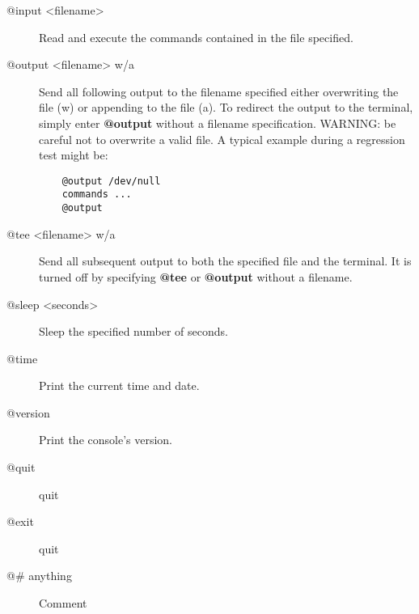 \begin{description}

\item [@input {\textless}filename{\textgreater}]
   Read and execute the commands  contained in the file specified.

\item [@output {\textless}filename{\textgreater} w/a]
   Send all following output to the  filename specified either overwriting the
file (w) or appending to  the file (a). To redirect the output to the
terminal, simply enter  {\bf @output} without a filename specification.
WARNING: be careful  not to overwrite a valid file. A typical example during a
regression  test might be:

\footnotesize
\begin{verbatim}
    @output /dev/null
    commands ...
    @output

\end{verbatim}
\normalsize

\item [@tee {\textless}filename{\textgreater} w/a]
   Send all subsequent output to  both the specified file and the terminal. It is
   turned off by  specifying {\bf @tee} or {\bf @output} without a filename.

\item [@sleep {\textless}seconds{\textgreater}]
   Sleep the specified number of seconds.

\item [@time]
   Print the current time and date.

\item [@version]
   Print the console's version.

\item [@quit]
   quit

\item [@exit]
   quit

\item [@\# anything]
   Comment


\end{description}

